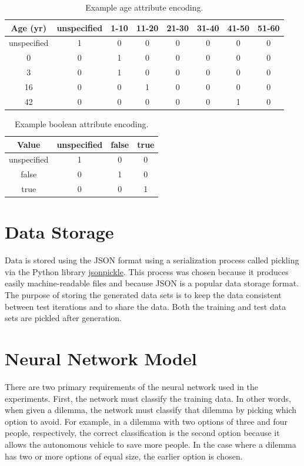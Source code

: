 \documentclass[]{report}
\begin{document}
\begin{table}[h]
    \centering
    \begin{tabular}{c|c|c|c|c|c|c|c}
        Age (yr) & unspecified & 1-10 & 11-20 & 21-30 & 31-40 & 41-50 & 51-60 \\\hline
        unspecified & 1 & 0 & 0 & 0 & 0 & 0 & 0 \\
        0 & 0 & 1 & 0 & 0 & 0 & 0 & 0 \\
        3 & 0 & 1 & 0 & 0 & 0 & 0 & 0 \\
        16 & 0 & 0 & 1 & 0 & 0 & 0 & 0 \\
        42 & 0 & 0 & 0 & 0 & 0 & 1 & 0
    \end{tabular}
    \caption{Example age attribute encoding.}
    \label{tab:example_age_attribute_encoding}
\end{table}

\begin{table}[h]
    \centering
    \begin{tabular}{c|c|c|c}
        Value & unspecified & false & true \\\hline
        unspecified & 1 & 0 & 0 \\
        false & 0 & 1 & 0 \\
        true & 0 & 0 & 1
    \end{tabular}
    \caption{Example boolean attribute encoding.}
    \label{tab:example_boolean_attribute_encoding}
\end{table}

\FloatBarrier
\section{Data Storage}

Data is stored using the JSON format using a serialization process called pickling via the Python
library \href{https://jsonpickle.github.io/}{jsonpickle}. This process was chosen because it
produces easily machine-readable files and because JSON is a popular data storage format. The
purpose of storing the generated data sets is to keep the data consistent between test iterations
and to share the data. Both the training and test data sets are pickled after generation.

\FloatBarrier
\section{Neural Network Model}

There are two primary requirements of the neural network used in the experiments. First, the network
must classify the training data. In other words, when given a dilemma, the network must classify
that dilemma by picking which option to avoid. For example, in a dilemma with two options of three
and four people, respectively, the correct classification is the second option because it allows the
autonomous vehicle to save more people. In the case where a dilemma has two or more options of equal
size, the earlier option is chosen.
\end{document}
